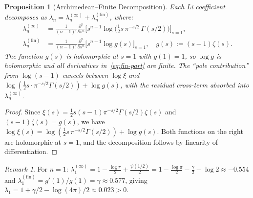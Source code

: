 \documentclass[12pt,a4paper]{article}
\newtheorem{proposition}[theorem]{Proposition}
\theoremstyle{definition}
\theoremstyle{remark}
\newtheorem{remark}[theorem]{Remark}
\begin{document}
\begin{proposition}[Archimedean--Finite Decomposition]\label{prop:arch-fin-decomp}
Each Li coefficient decomposes as $\lambda_n = \lambda_n^{(\infty)} + \lambda_n^{(\mathrm{fin})}$, where:
\begin{align}
\lambda_n^{(\infty)} &= \frac{1}{(n-1)!} \frac{\partial^n}{\partial s^n} \Big[ s^{n-1} \log\!\big(\tfrac{1}{2}s\,\pi^{-s/2}\,\Gamma(s/2)\big) \Big]_{s=1}, \label{eq:arch-part} \\
\lambda_n^{(\mathrm{fin})} &= \frac{1}{(n-1)!} \frac{\partial^n}{\partial s^n} \Big[ s^{n-1} \log g(s) \Big]_{s=1}, \quad g(s) := (s-1)\zeta(s). \label{eq:fin-part}
\end{align}
The function $g(s)$ is holomorphic at $s=1$ with $g(1)=1$, so $\log g$ is holomorphic and all derivatives in~\eqref{eq:fin-part} are finite. The ``pole contribution'' from $\log(s-1)$ cancels between $\log\xi$ and $\log(\frac{1}{2}s\cdot\pi^{-s/2}\Gamma(s/2)) + \log g(s)$, with the residual cross-term absorbed into $\lambda_n^{(\infty)}$.
\end{proposition}

\begin{proof}
Since $\xi(s) = \frac{1}{2}s(s-1)\pi^{-s/2}\Gamma(s/2)\zeta(s)$ and $(s-1)\zeta(s) = g(s)$, we have $\log\xi(s) = \log(\frac{1}{2}s\,\pi^{-s/2}\Gamma(s/2)) + \log g(s)$. Both functions on the right are holomorphic at $s=1$, and the decomposition follows by linearity of differentiation.
\end{proof}

\begin{remark}
For $n=1$: $\lambda_1^{(\infty)} = 1 - \frac{\log\pi}{2} + \frac{\psi(1/2)}{2} = 1 - \frac{\log\pi}{2} - \frac{\gamma}{2} - \log 2 \approx -0.554$ and $\lambda_1^{(\mathrm{fin})} = g'(1)/g(1) = \gamma \approx 0.577$, giving $\lambda_1 = 1 + \gamma/2 - \log(4\pi)/2 \approx 0.023 > 0$.
\end{remark}
\end{document}
